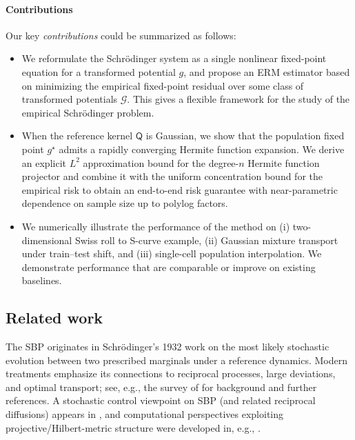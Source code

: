 \documentclass[11pt]{article}
\theoremstyle{remark}
\numberwithin{equation}{section}
\def\RefLaw{\mathsf{Q}}
\begin{document}
\paragraph{Contributions} Our key \emph{contributions} could be summarized as follows: 
\begin{itemize}[noitemsep, nolistsep]
\item We reformulate the Schr\"odinger system as a single nonlinear fixed-point equation for a transformed potential $g$, and propose an ERM estimator based on minimizing the empirical fixed-point residual over some class of transformed potentials $\mathcal{G}$.
This gives a flexible framework for the study of the empirical Schr\"odinger problem.

\item When the reference kernel $\RefLaw$ is Gaussian, we show that the population fixed point $g^\star$ admits a rapidly converging  Hermite function expansion.
We derive an explicit $L^2$ approximation bound for the degree-$n$ Hermite function projector and combine it with the
uniform concentration bound for the empirical risk to obtain an end-to-end risk guarantee  with near-parametric dependence on sample size up to polylog factors.


\item 
We numerically illustrate the performance of the method on (i) two-dimensional Swiss roll to S-curve example, (ii) Gaussian mixture transport under train--test shift,  and (iii) single-cell population interpolation. We demonstrate performance that are comparable or improve on existing baselines.
\end{itemize}




\subsection{Related work}
The SBP originates in Schr\"odinger’s 1932 work \cite{Schrodinger1932} on the most likely
stochastic evolution between two prescribed marginals under a reference dynamics.
Modern treatments emphasize its connections to reciprocal processes, large deviations, and optimal
transport; see, e.g., the survey of \citet{Leonard2014} for background and further references.
A stochastic control viewpoint on SBP (and related reciprocal diffusions) appears in
\citet{Daipra1991}, and computational perspectives exploiting projective/Hilbert-metric structure
were developed in, e.g., \citet{ChenGeorgiouPavon2016}.
\end{document}
